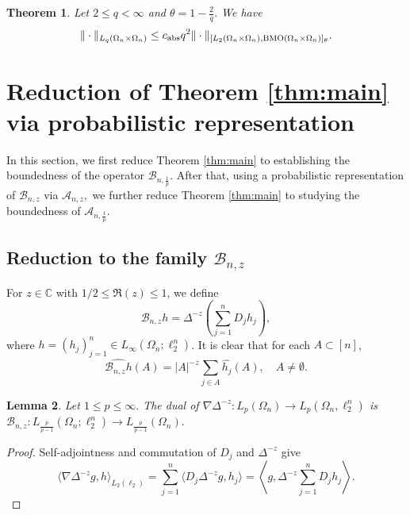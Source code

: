 \documentclass{amsart}
\numberwithin{equation}{section}
\newtheorem{thm}{Theorem}[section]
\newtheorem{lem}[thm]{Lemma}
\theoremstyle{definition}
\theoremstyle{remark}
\newcommand{\1}{\mathbf 1}
\newcommand{\BMO}{\mathrm{BMO}}
\begin{document}
\begin{thm}\label{thm:product-interpolation}
Let $2\leq q<\infty$ and $\theta=1-\frac{2}{q}.$ We have
\[
\|\cdot\|_{L_q(\Omega_n\times\Omega_n)}\leq c_{{\rm abs}}q^2\|\cdot\|_{[L_2(\Omega_n\times\Omega_n),\BMO(\Omega_n\times\Omega_n)]_{\theta}}.
\]
\end{thm}




\section{Reduction of Theorem \ref{thm:main} via probabilistic representation }\label{sec:lift}

In this section, we first reduce Theorem \ref{thm:main} to establishing the boundedness of the operator $\mathcal{B}_{n,\frac1p}.$ After that, using a probabilistic representation of $\mathcal{B}_{n,z}$ via $\mathcal{A}_{n,z},$  we further reduce  Theorem \ref{thm:main} to studying the boundedness of $\mathcal{A}_{n,\frac1p}.$
 
\subsection{Reduction to the family $\mathcal{B}_{n,z}$}

For $z\in \mathbb{C}$ with $1/2\leq\Re(z)\leq1$, we define
\begin{equation*}
\mathcal{B}_{n,z}h=\Delta^{-z}\left(\sum_{j=1}^{n}D_{j}h_{j}\right),
\end{equation*}
where $h=(h_{j})_{j=1}^{n}\in L_{\infty}(\Omega_{n};\ell_{2}^{n})$. It is clear that for each $A\subset  [n]$,  
\begin{equation*}
\widehat{\mathcal{B}_{n,z}h}(A)=|A|^{-z}\sum_{j\in A}\widehat{h_j}(A),\quad A\neq\emptyset.
\end{equation*}

\begin{lem}\label{lem:dual-reduction} Let $1\leq p\leq\infty.$ The dual of $\nabla\Delta^{-z}:L_p(\Omega_n)\to L_p(\Omega_n,\ell^{n}_{2})$ is $\mathcal{B}_{n,z}:L_{\frac{p}{p-1}}(\Omega_n;\ell^{n}_{2})\to L_{\frac{p}{p-1}}(\Omega_n).$
\end{lem}
\begin{proof} Self-adjointness and commutation of $D_{j}$ and $\Delta^{-z}$ give
$$
\langle \nabla\Delta^{-z}g,h\rangle_{L_{2}(\ell_{2})}=\sum_{j=1}^{n}\langle D_{j}\Delta^{-z}g,h_{j}\rangle=\left\langle g,\Delta^{-z}\sum_{j=1}^{n}D_{j}h_{j}\right\rangle.
$$
\end{proof}
\end{document}
